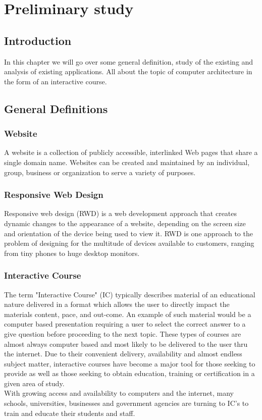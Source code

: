 \chapter{Preliminary study}

\section{Introduction}
In this chapter we will go over some general definition, study of the existing and analysis of existing applications.
 All about the topic of computer architecture in the form of an interactive course.


\section{General Definitions}
\subsection{Website}
A website is a collection of publicly accessible, interlinked Web pages that share 
a single domain name. Websites can be created and maintained by an individual, group, 
business or organization to serve a variety of purposes.\cite{Techopedia2011-zo}

\subsection{Responsive Web Design}
Responsive web design (RWD) is a web development approach that creates dynamic 
changes to the appearance of a website, depending on the screen size and orientation of 
the device being used to view it. RWD is one approach to the problem of designing for 
the multitude of devices available to customers, ranging from tiny phones to huge desktop monitors.\cite{noauthor_undated-an}

\subsection{Interactive Course}
The term "Interactive Course" (IC) typically describes material of an educational nature 
delivered in a format which allows the user to directly impact the materials content, pace, and out-come.
An example of such material would be a computer based presentation requiring a user to select the correct 
answer to a give question before proceeding to the next topic.
These types of courses are almost always computer based and most likely to be delivered to the user thru the internet. 
Due to their convenient delivery, availability and almost endless subject matter, 
interactive courses have become a major tool for those seeking to provide as well as those seeking to obtain education, 
training or certification in a given area of study.\\
With growing access and availability to computers and the internet, many schools, universities, 
businesses and government agencies are turning to IC's to train and educate their students and staff.\cite{noauthor_undated-dt}

